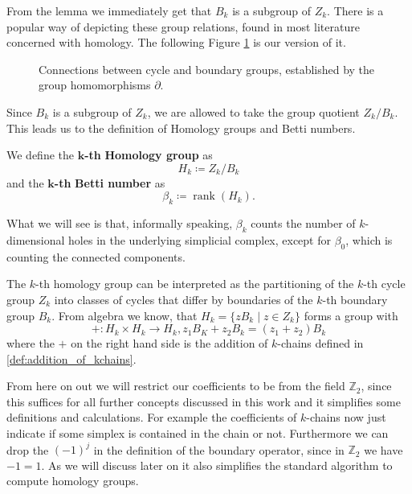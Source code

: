 From the lemma we immediately get that $B_k$ is a subgroup of $Z_k$. There is a popular way of depicting these group relations, found in most literature concerned with homology. The following Figure \ref{fig:group_relations} is our version of it.

\begin{figure}[H]
\begin{subfigure}[c]{0.49\textwidth}
\begin{center}

\end{center}
\end{subfigure}
\caption{Connections between cycle and boundary groups, established by the group homomorphisms $\partial$.}
\label{fig:group_relations}
\end{figure}


Since $B_k$ is a subgroup of $Z_k$, we are allowed to take the group quotient $Z_k/B_k$. This leads us to the definition of Homology groups and Betti numbers.
\begin{defi}
We define the  $\bm{k}$\textbf{-th}  \textbf{Homology group} as
\[
    H_k \coloneqq Z_k/B_k
\]
and the $\bm{k}$\textbf{-th} \textbf{Betti number} as \[ \beta_k \coloneqq \operatorname{rank}(H_k).\]
\end{defi}

What we will see is that, informally speaking, $\beta_k$ counts the number of $k$-dimensional holes in the underlying simplicial complex, except for $\beta_0$, which is counting the connected components.

The $k$-th homology group can be interpreted as the partitioning of the $k$-th cycle group $Z_k$ into classes of cycles that differ by boundaries of the $k$-th boundary group $B_k$. From algebra we know, that $H_k = \{zB_k \mid z \in Z_k\}$ forms a group with \[+: H_k \times H_k \rightarrow H_k, z_1B_K+z_2B_k = (z_1+z_2)B_k\] where the $+$ on the right hand side is the addition of $k$-chains defined in \ref{def:addition_of_kchains}. 

From here on out we will restrict our coefficients to be from the field $\mathbb{Z}_2$, since this suffices for all further concepts discussed in this work and it simplifies some definitions and calculations. For example the coefficients of $k$-chains now just indicate if some simplex is contained in the chain or not. Furthermore we can drop the $(-1)^j$ in the definition of the boundary operator, since in $\mathbb{Z}_2$ we have $-1 = 1$. As we will discuss later on it also simplifies the standard algorithm to compute homology groups.

